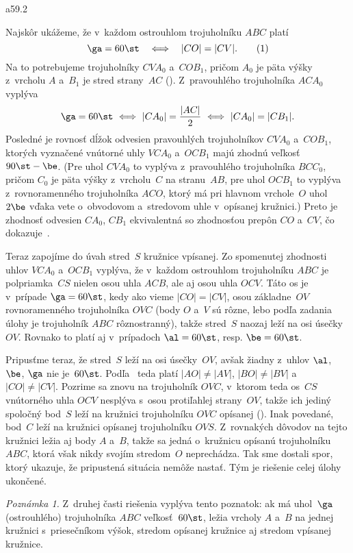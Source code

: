 {%
\epsplace a59.2 \hfil\Obr

Najskôr ukážeme, že v~každom ostrouhlom trojuholníku $ABC$ platí
$$
\ga=60\st\quad\Longleftrightarrow\quad |CO|=|CV|. \tag1
$$
Na to potrebujeme trojuholníky $CV\!A_0$ a~$COB_1$, pričom
$A_0$ je päta výšky z~vrcholu $A$ a~$B_1$ je stred strany~$AC$
(\obr). Z~pravouhlého trojuholníka $ACA_0$ vyplýva
$$
\ga=60\st\ \Longleftrightarrow\ |CA_0|=\frac{|AC|}{2}\
\Longleftrightarrow\ |CA_0|=|CB_1|.
$$
Posledné je rovnosť dĺžok odvesien pravouhlých trojuholníkov $CV\!A_0$
a~$COB_1$, ktorých vyznačené vnútorné uhly $VCA_0$ a~$OCB_1$ majú zhodnú
veľkosť $90\st-\be$. (Pre uhol $CV\!A_0$ to vyplýva z~pravouhlého
trojuholníka $BCC_0$, pričom $C_0$ je päta výšky z~vrcholu~$C$ na stranu~$AB$, pre uhol $OCB_1$ to vyplýva z~rovnoramenného trojuholníka $ACO$, ktorý má
pri hlavnom vrchole~$O$ uhol $2\be$ vďaka vete o~obvodovom
a~stredovom uhle v~opísanej kružnici.) Preto je zhodnosť
odvesien $CA_0$, $CB_1$ ekvivalentná so zhodnosťou
prepôn $CO$ a~$CV$, čo dokazuje~.
\inspicture

Teraz zapojíme do úvah stred~$S$ kružnice vpísanej. Zo spomenutej zhodnosti
uhlov $VCA_0$ a~$OCB_1$ vyplýva, že v~každom ostrouhlom trojuholníku $ABC$
je polpriamka~$CS$ nielen osou uhla $ACB$, ale aj osou uhla
$OCV$. Táto os je v~prípade $\ga=60\st$, kedy ako vieme
$|CO|=|CV|$, osou základne~$OV$ rovnoramenného trojuholníka $OVC$ (body
$O$ a~$V$ sú rôzne, lebo podľa zadania úlohy je trojuholník $ABC$
rôznostranný), takže stred~$S$ naozaj leží na osi úsečky~$OV$.
Rovnako to platí aj v~prípadoch $\al=60\st$, resp. $\be=60\st$.

Pripusťme teraz, že stred~$S$ leží na osi úsečky~$OV$, avšak
žiadny z~uhlov $\al$, $\be$, $\ga$ nie je~$60\st$. Podľa~
teda platí $|AO|\ne|AV|$, $|BO|\ne|BV|$
a~$|CO|\ne|CV|$. Pozrime sa znovu na trojuholník $OVC$, v~ktorom
teda os~$CS$ vnútorného uhla $OCV$ nesplýva s~osou protiľahlej
strany~$OV$, takže ich jediný spoločný bod~$S$ leží na
kružnici trojuholníku $OVC$ opísanej ().
Inak povedané, bod~$C$ leží na kružnici opísanej trojuholníku $OVS$. Z~rovnakých dôvodov na tejto
kružnici ležia aj body $A$ a~$B$, takže sa jedná o~kružnicu opísanú
trojuholníku $ABC$, ktorá však nikdy svojím stredom~$O$ neprechádza. Tak sme dostali
spor, ktorý ukazuje, že pripustená situácia nemôže nastať. Tým je
riešenie celej úlohy ukončené.

\smallskip
{\it Poznámka 1.}
Z~druhej časti riešenia vyplýva tento poznatok: ak má uhol~$\ga$
(ostrouhlého) trojuholníka $ABC$ veľkosť~$60\st$, ležia vrcholy $A$ a~$B$
na jednej kružnici s~priesečníkom výšok, stredom opísanej kružnice
aj stredom vpísanej kružnice.\niedorocenky{ Jednoduchšie zdôvodnenie
uvádzame v~úlohe N1.}

}
